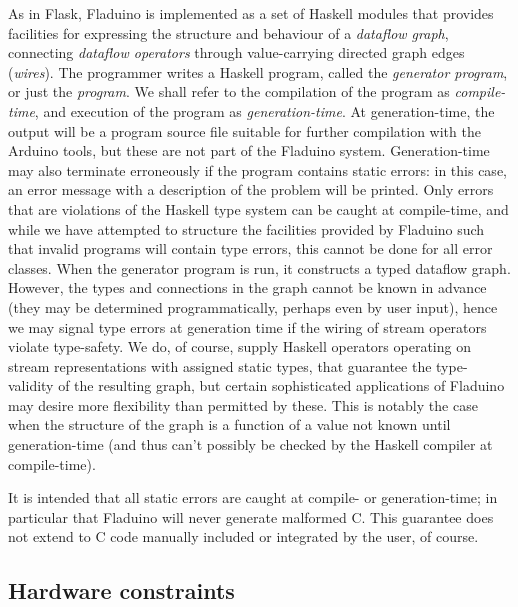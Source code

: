 \documentclass[a4paper, oneside, final]{memoir}
\begin{document}
As in Flask, Fladuino is implemented as a set of Haskell modules that
provides facilities for expressing the structure and behaviour of a
\textit{dataflow graph}, connecting \textit{dataflow operators}
through value-carrying directed graph edges (\textit{wires}).
 The
programmer writes a Haskell program, called the \textit{generator
  program}, or just the \textit{program}.  We shall refer to the
compilation of the program as \textit{compile-time}, and execution of
the program as \textit{generation-time}.  At generation-time, the
output will be a program source file suitable for further compilation
with the Arduino tools, but these are not part of the Fladuino system.
Generation-time may also terminate erroneously if the program
contains static errors: in this case, an error message with a
description of the problem will be printed.  Only errors that are
violations of the Haskell type system can be caught at compile-time,
and while we have attempted to structure the facilities provided by
Fladuino such that invalid programs will contain type errors, this
cannot be done for all error classes.  When the generator program is
run, it constructs a typed dataflow graph.  However, the types and
connections in the graph cannot be known in advance (they may be
determined programmatically, perhaps even by user input), hence we may
signal type errors at generation time if the wiring of stream
operators violate type-safety.  We do, of course, supply Haskell
operators operating on stream representations with assigned static
types, that guarantee the type-validity of the resulting graph, but
certain sophisticated applications of Fladuino may desire more
flexibility than permitted by these.  This is notably the case when
the structure of the graph is a function of a value not known until
generation-time (and thus can't possibly be checked by the Haskell
compiler at compile-time).

It is intended that all static errors are caught at compile- or
generation-time; in particular that Fladuino will never generate
malformed C.  This guarantee does not extend to C code manually
included or integrated by the user, of course.

\subsection{Hardware constraints}
\end{document}
